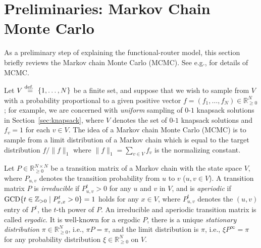 \documentclass[letter, 11pt]{article}
\newcommand{\defeq}{\stackrel{\mbox{\scriptsize{\normalfont\rmfamily def. }}}{=}}
\newcommand{\1}{\mbox{1}\hspace{-0.25em}\mbox{l}}
\newcommand{\GCD}{{\rm GCD}}
\begin{document}
\section{Preliminaries: Markov Chain Monte Carlo}\label{sec:MCMC}
As a preliminary step of explaining the functional-router model, this section briefly reviews the Markov chain Monte Carlo (MCMC). 
 See e.g., \cite{Sinclair93, LPW08, MT06} for details of MCMC. 

 Let $V \defeq \{1, \ldots, N\}$ be a finite set, and 
  suppose that we wish to sample from $V$ with a probability 
  proportional to a given positive vector $f=(f_1, \ldots, f_N) \in \mathbb{R}_{\geq 0}^{N}$; 
  for example, we are concerned with {\em uniform} sampling of $0$-$1$ knapsack solutions in Section~\ref{sec:knapsack}, 
   where $V$ denotes the set of $0$-$1$ knapsack solutions and $f_v = 1$ for each $v \in V$. 
The idea of a Markov chain Monte Carlo (MCMC) is 
   to sample from a limit distribution of a Markov chain 
   which is equal to the target distribution $f/\|f\|_1$ 
   where $\|f\|_1 = \sum_{v \in V} f_v$ is the normalizing constant. 

Let $P \in \mathbb{R}_{\geq 0}^{N \times N}$ be 
   a transition matrix of a Markov chain with the state space $V$, 
  where $P_{u, v}$ denotes the transition probability from $u$ to $v$ ($u, v \in V$). 
A transition matrix $P$ is {\em irreducible} if $P^t_{u, v} > 0$ for any $u$ and $v$ in $V$, and 
  is {\em aperiodic} if $\GCD\{ t \in \mathbb{Z}_{>0} \mid P^t_{x, x} > 0\} = 1$ holds for any $x \in V$, 
  where $P^t_{u, v}$ denotes the $(u, v)$ entry of $P^t$, the $t$-th power of $P$. 
 An irreducible and aperiodic transition matrix is called {\em ergodic}. 
It is well-known for a ergodic $P$, 
  there is a unique {\em stationary distribution} $\pi \in \mathbb{R}_{\geq 0}^{N}$, 
   i.e., $\pi P = \pi$, 
  and the limit distribution is $\pi$, 
   i.e., $\xi P^{\infty} = \pi$ for any probability distribution $\xi\in \mathbb{R}_{\geq 0}^{N}$ on $V$. 
\end{document}
